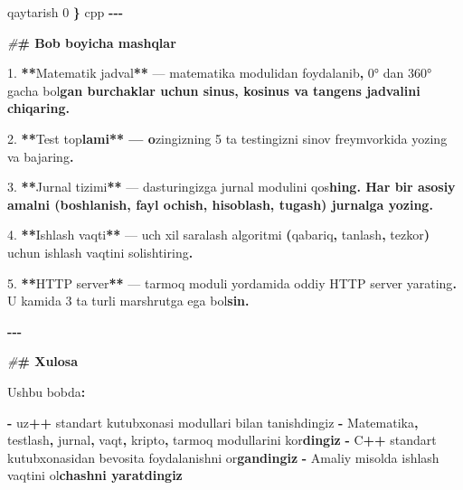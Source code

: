 \documentclass[a4paper,11pt,twoside,openright]{book}
\newenvironment{Shaded}{\begin{snugshade}}{\end{snugshade}}
\newcommand{\CharTok}[1]{\textcolor[rgb]{0.31,0.60,0.02}{#1}}
\newcommand{\DecValTok}[1]{\textcolor[rgb]{0.00,0.00,0.81}{#1}}
\newcommand{\ErrorTok}[1]{\textcolor[rgb]{0.64,0.00,0.00}{\textbf{#1}}}
\newcommand{\FloatTok}[1]{\textcolor[rgb]{0.00,0.00,0.81}{#1}}
\newcommand{\NormalTok}[1]{#1}
\newcommand{\OperatorTok}[1]{\textcolor[rgb]{0.81,0.36,0.00}{\textbf{#1}}}
\newcommand{\PreprocessorTok}[1]{\textcolor[rgb]{0.56,0.35,0.01}{\textit{#1}}}
\begin{document}
\begin{Shaded}
\begin{Highlighting}[]
\NormalTok{    qaytarish }\DecValTok{0}
\OperatorTok{\}}
\ErrorTok{\textasciigrave{}\textasciigrave{}\textasciigrave{}}\NormalTok{cpp}
\OperatorTok{{-}{-}{-}}

\PreprocessorTok{\#}\ErrorTok{\# Bob bo\textquotesingle{}yicha mashqlar}

\FloatTok{1.} \OperatorTok{**}\NormalTok{Matematik jadval}\OperatorTok{**}\NormalTok{ — }\ErrorTok{\textasciigrave{}}\NormalTok{matematika}\ErrorTok{\textasciigrave{}}\NormalTok{ modulidan foydalanib}\OperatorTok{,} \DecValTok{0}\NormalTok{° dan }\DecValTok{360}\NormalTok{° gacha bo}\CharTok{\textquotesingle{}l}\ErrorTok{gan burchaklar uchun sinus, kosinus va tangens jadvalini chiqaring.}

\FloatTok{2.} \OperatorTok{**}\NormalTok{Test to}\CharTok{\textquotesingle{}p}\ErrorTok{lami** — o}\CharTok{\textquotesingle{}}\NormalTok{zingizning }\DecValTok{5}\NormalTok{ ta testingizni }\ErrorTok{\textasciigrave{}}\NormalTok{sinov}\ErrorTok{\textasciigrave{}}\NormalTok{ freymvorkida yozing va bajaring}\OperatorTok{.}

\FloatTok{3.} \OperatorTok{**}\NormalTok{Jurnal tizimi}\OperatorTok{**}\NormalTok{ — dasturingizga }\ErrorTok{\textasciigrave{}}\NormalTok{jurnal}\ErrorTok{\textasciigrave{}}\NormalTok{ modulini qo}\CharTok{\textquotesingle{}s}\ErrorTok{hing. Har bir asosiy amalni (boshlanish, fayl ochish, hisoblash, tugash) jurnalga yozing.}

\FloatTok{4.} \OperatorTok{**}\NormalTok{Ishlash vaqti}\OperatorTok{**}\NormalTok{ — uch xil saralash algoritmi }\OperatorTok{(}\NormalTok{qabariq}\OperatorTok{,}\NormalTok{ tanlash}\OperatorTok{,}\NormalTok{ tezkor}\OperatorTok{)}\NormalTok{ uchun ishlash vaqtini solishtiring}\OperatorTok{.}

\FloatTok{5.} \OperatorTok{**}\NormalTok{HTTP server}\OperatorTok{**}\NormalTok{ — }\ErrorTok{\textasciigrave{}}\NormalTok{tarmoq}\ErrorTok{\textasciigrave{}}\NormalTok{ moduli yordamida oddiy HTTP server yarating}\OperatorTok{.}\NormalTok{ U kamida }\DecValTok{3}\NormalTok{ ta turli marshrutga ega bo}\CharTok{\textquotesingle{}l}\ErrorTok{sin.}

\OperatorTok{{-}{-}{-}}

\PreprocessorTok{\#}\ErrorTok{\# Xulosa}

\NormalTok{Ushbu bobda}\OperatorTok{:}

\OperatorTok{{-}}\NormalTok{ uz}\OperatorTok{++}\NormalTok{ standart kutubxonasi modullari bilan tanishdingiz}
\OperatorTok{{-}}\NormalTok{ Matematika}\OperatorTok{,}\NormalTok{ testlash}\OperatorTok{,}\NormalTok{ jurnal}\OperatorTok{,}\NormalTok{ vaqt}\OperatorTok{,}\NormalTok{ kripto}\OperatorTok{,}\NormalTok{ tarmoq modullarini ko}\CharTok{\textquotesingle{}r}\ErrorTok{dingiz}
\OperatorTok{{-}}\NormalTok{ C}\OperatorTok{++}\NormalTok{ standart kutubxonasidan bevosita foydalanishni o}\CharTok{\textquotesingle{}r}\ErrorTok{gandingiz}
\OperatorTok{{-}}\NormalTok{ Amaliy misolda ishlash vaqtini o}\CharTok{\textquotesingle{}l}\ErrorTok{chashni yaratdingiz}


\end{Highlighting}
\end{Shaded}
\end{document}
